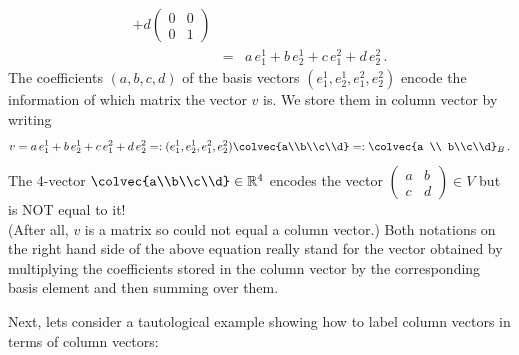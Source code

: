 \begin{example}
\begin{eqnarray*}
+d\begin{pmatrix}0&0\\0&1\end{pmatrix}\\[1mm]
&=&a\,  e^1_1+b \, e^1_2+c \, e^2_1+d \, e^2_2\, .
\end{eqnarray*}
The coefficients $(a,b,c,d)$ of the basis vectors $(e^1_1,e^1_2,e^2_1,e^2_2)$ encode the information of which matrix the vector $v$ is.
We store them in column vector by writing
$$
v=a \, e^1_1+b \, e^1_2+c\,  e^2_1+d \, e^2_2=: (e^1_1,e^1_2,e^2_1,e^2_2)\colvec{a\\b\\c\\d}=:\colvec{a \\ b\\c\\d}_B\, .
$$
The 4-vector $\colvec{a\\b\\c\\d} \in \mathbb{R}^4$ encodes the vector $\begin{pmatrix}a&b\\c&d\end{pmatrix}\in V$ but is NOT equal to it! \\(After all, $v$ is a matrix so could not equal a column vector.) Both notations on the right hand side of the above equation really stand for the vector obtained by multiplying the coefficients stored in the column vector by the corresponding basis element and then summing over them.
\end{example}
 
Next, lets consider a tautological example showing how to label column vectors in terms of column vectors:

